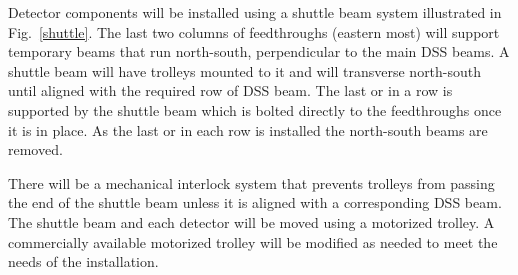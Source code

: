 Detector components will be installed using a shuttle beam system
illustrated in Fig.~\ref{shuttle}.  The last two columns of
feedthroughs (eastern most) will support temporary beams that run
north-south, perpendicular to the main DSS beams.  A shuttle beam
will have trolleys mounted to it and will transverse
north-south until aligned with the required row of DSS beam.  The last
 or  in a row is supported by the shuttle beam which is bolted
directly to the feedthroughs once it is in place.  As the last  or
 in each row is installed the north-south beams are removed.

There will be a mechanical interlock system that prevents trolleys
from passing the end of the shuttle beam unless it is aligned with a
corresponding DSS beam.  The shuttle beam and each detector will be
moved using a motorized trolley.  A commercially available motorized
trolley will be modified as needed to meet the needs of the
installation.
